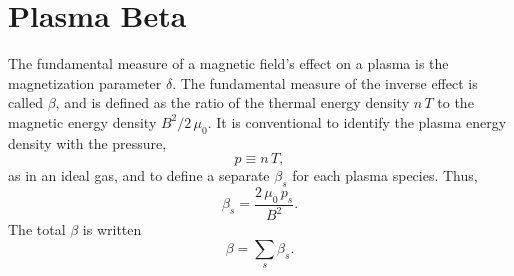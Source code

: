 \section{Plasma Beta}\label{s1.10}
The fundamental measure of a magnetic field's effect on a plasma is the
magnetization parameter $\delta$. The fundamental measure of the
inverse effect is called $\beta$, and is defined as the ratio
of the thermal energy density $n\,T$ to the magnetic energy
density $B^2/2\,\mu_0$. It is conventional to identify the plasma
energy density with the pressure,
\begin{equation}
p \equiv n\,T,
\end{equation}
as in an ideal gas, and to define a separate $\beta_s$ for each plasma
species. Thus,
\begin{equation}
\beta_s = \frac{2\,\mu_0\,p_s}{B^2}.
\end{equation}
The total $\beta$ is written
\begin{equation}
\beta = \sum_s \beta_s.
\end{equation}
